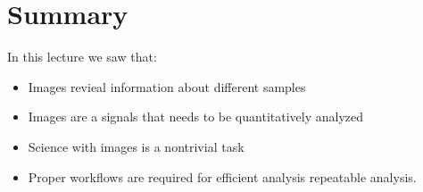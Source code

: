 \documentclass[letterpaper,10pt,english]{sphinxmanual}
\begin{document}
\chapter{Summary}
\label{\detokenize{01-Introduction:summary}}
\sphinxAtStartPar
In this lecture we saw that:
\begin{itemize}
\item {} 
\sphinxAtStartPar
Images revieal information about different samples

\item {} 
\sphinxAtStartPar
Images are a signals that needs to be quantitatively analyzed

\item {} 
\sphinxAtStartPar
Science with images is a non\sphinxhyphen{}trivial task

\item {} 
\sphinxAtStartPar
Proper workflows are required for efficient analysis repeatable analysis.

\end{itemize}







\renewcommand{\indexname}{Index}
\printindex
\end{document}
